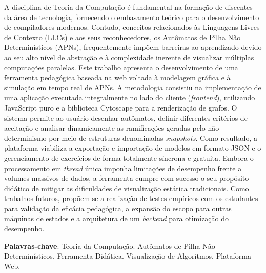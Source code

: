 \setlength{\absparsep}{18pt} %

\begin{resumo}
A disciplina de Teoria da Computação é fundamental na formação de discentes da área de tecnologia, fornecendo o embasamento teórico para o desenvolvimento de compiladores modernos. Contudo, conceitos relacionados às Linguagens Livres de Contexto (LLCs) e aos seus reconhecedores, os Autômatos de Pilha Não Determinísticos (APNs), frequentemente impõem barreiras ao aprendizado devido ao seu alto nível de abstração e à complexidade inerente de visualizar múltiplas computações paralelas. Este trabalho apresenta o desenvolvimento de uma ferramenta pedagógica baseada na web voltada à modelagem gráfica e à simulação em tempo real de APNs. A metodologia consistiu na implementação de uma aplicação executada integralmente no lado do cliente (\textit{frontend}), utilizando JavaScript puro e a biblioteca Cytoscape para a renderização de grafos. O sistema permite ao usuário desenhar autômatos, definir diferentes critérios de aceitação e analisar dinamicamente as ramificações geradas pelo não-determinismo por meio de estruturas denominadas \textit{snapshots}. Como resultado, a plataforma viabiliza a exportação e importação de modelos em formato JSON e o gerenciamento de exercícios de forma totalmente síncrona e gratuita. Embora o processamento em \textit{thread} única imponha limitações de desempenho frente a volumes massivos de dados, a ferramenta cumpre com sucesso o seu propósito didático de mitigar as dificuldades de visualização estática tradicionais. Como trabalhos futuros, propõem-se a realização de testes empíricos com os estudantes para validação da eficácia pedagógica, a expansão do escopo para outras máquinas de estados e a arquitetura de um \textit{backend} para otimização do desempenho.

\textbf{Palavras-chave}: Teoria da Computação. Autômatos de Pilha Não Determinísticos. Ferramenta Didática. Visualização de Algoritmos. Plataforma Web.
\end{resumo}